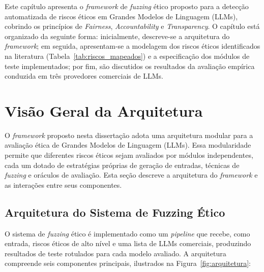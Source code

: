 \label{cap:proposta}

Este capítulo apresenta o \textit{framework} de \textit{fuzzing} ético proposto para a detecção automatizada de riscos éticos em Grandes Modelos de Linguagem (LLMs), cobrindo os princípios de \textit{Fairness}, \textit{Accountability} e \textit{Transparency}. O capítulo está organizado da seguinte forma: inicialmente, descreve-se a arquitetura do \textit{framework}; em seguida, apresentam-se a modelagem dos riscos éticos identificados na literatura (Tabela~\ref{tab:riscos_mapeados}) e a especificação dos módulos de teste implementados; por fim, são discutidos os resultados da avaliação empírica conduzida em três provedores comerciais de LLMs.

\section{Visão Geral da Arquitetura}
\label{sec:arquitetura}

O \textit{framework} proposto nesta dissertação adota uma arquitetura modular para a avaliação ética de Grandes Modelos de Linguagem (LLMs). Essa modularidade permite que diferentes riscos éticos sejam avaliados por módulos independentes, cada um dotado de estratégias próprias de geração de entradas, técnicas de \textit{fuzzing} e oráculos de avaliação. Esta seção descreve a arquitetura do \textit{framework} e as interações entre seus componentes.

\subsection{Arquitetura do Sistema de Fuzzing Ético}

O sistema de \textit{fuzzing} ético é implementado como um \textit{pipeline} que recebe, como entrada, riscos éticos de alto nível e uma lista de LLMs comerciais, produzindo resultados de teste rotulados para cada modelo avaliado. A arquitetura compreende seis componentes principais, ilustrados na Figura~\ref{fig:arquitetura}:


